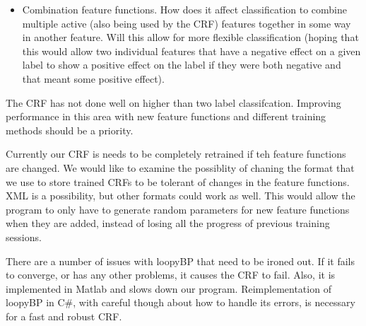 \documentclass[10pt]{acmsiggraph}               %
\begin{document}
\begin{itemize}
\item Combination feature functions.  How does it affect classification to combine multiple active (also being used by the CRF)
features together in some way in another feature.  Will this
allow for more flexible classification (hoping that this would allow two individual features that have a negative effect on a given label to show a positive
effect on the label if they were both negative and that meant some positive effect).
\end{itemize}

The CRF has not done well on higher than two label classifcation.  Improving performance in this area with new feature functions and different training methods should be a priority.

Currently our CRF is needs to be completely retrained if teh feature functions are changed.  We would like to examine the possiblity of chaning the format that we use to store trained CRFs to be tolerant of changes in the feature functions.  XML is a possibility, but other formats could work as well.  This would allow the program to only have to generate random parameters for new feature functions when they are added, instead of losing all the progress of previous training sessions.

There are a number of issues with loopyBP that need to be ironed out.  If it fails to converge, or has any other problems, it causes the CRF to fail.  Also, it is implemented in Matlab and slows down our program.  Reimplementation of loopyBP in C\#, with careful though about how to handle its errors, is necessary for a fast and robust CRF.

\end{document}
